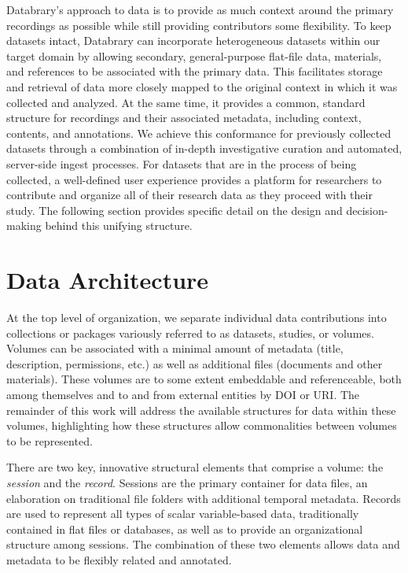 \documentclass{sig-alternate}
\begin{document}
Databrary's approach to data is to provide as much context around the primary recordings as possible while still providing contributors some flexibility.
To keep datasets intact, Databrary can incorporate heterogeneous datasets within our target domain by allowing secondary, general-purpose flat-file data, materials, and references to be associated with the primary data.
This facilitates storage and retrieval of data more closely mapped to the original context in which it was collected and analyzed.
At the same time, it provides a common, standard structure for recordings and their associated metadata, including context, contents, and annotations.
We achieve this conformance for previously collected datasets through a combination of in-depth investigative curation and automated, server-side ingest processes.
For datasets that are in the process of being collected, a well-defined user experience provides a platform for researchers to contribute and organize all of their research data as they proceed with their study.
The following section provides specific detail on the design and decision-making behind this unifying structure.

\section{Data Architecture}


At the top level of organization, we separate individual data contributions into collections or packages variously referred to as datasets, studies, or volumes.
Volumes can be associated with a minimal amount of metadata (title, description, permissions, etc.) as well as additional files (documents and other materials).
These volumes are to some extent embeddable and referenceable, both among themselves and to and from external entities by DOI or URI.
The remainder of this work will address the available structures for data within these volumes, highlighting how these structures allow commonalities between volumes to be represented.

There are two key, innovative structural elements that comprise a volume: the \emph{session} and the \emph{record}.
Sessions are the primary container for data files, an elaboration on traditional file folders with additional temporal metadata.
Records are used to represent all types of scalar variable-based data, traditionally contained in flat files or databases, as well as to provide an organizational structure among sessions.
The combination of these two elements allows data and metadata to be flexibly related and annotated.
\end{document}
